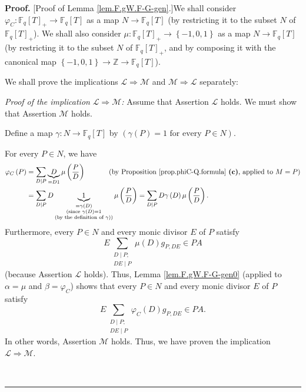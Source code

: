 \documentclass[numbers=enddot,12pt,final,onecolumn,notitlepage]{scrartcl}%
\theoremstyle{definition}
\newenvironment{proof}[1][Proof]{\noindent\textbf{#1.} }{\ \rule{0.5em}{0.5em}}
\let\sumnonlimits\sum
\renewcommand{\sum}{\sumnonlimits\limits}
\begin{document}
\begin{proof}
[Proof of Lemma \ref{lem.F.gW.F-G-gen}.]We shall consider $\varphi
_{C}:\mathbb{F}_{q}\left[  T\right]  _{+}\rightarrow\mathbb{F}_{q}\left[
T\right]  $ as a map $N\rightarrow\mathbb{F}_{q}\left[  T\right]  $ (by
restricting it to the subset $N$ of $\mathbb{F}_{q}\left[  T\right]  _{+}$).
We shall also consider $\mu:\mathbb{F}_{q}\left[  T\right]  _{+}%
\rightarrow\left\{  -1,0,1\right\}  $ as a map $N\rightarrow\mathbb{F}%
_{q}\left[  T\right]  $ (by restricting it to the subset $N$ of $\mathbb{F}%
_{q}\left[  T\right]  _{+}$, and by composing it with the canonical map
$\left\{  -1,0,1\right\}  \rightarrow\mathbb{Z}\rightarrow\mathbb{F}%
_{q}\left[  T\right]  $).

We shall prove the implications $\mathcal{L}\Longrightarrow\mathcal{M}$ and
$\mathcal{M}\Longrightarrow\mathcal{L}$ separately:

\textit{Proof of the implication }$\mathcal{L}\Longrightarrow\mathcal{M}%
$\textit{:} Assume that Assertion $\mathcal{L}$ holds. We must show that
Assertion $\mathcal{M}$ holds.

Define a map $\gamma:N\rightarrow\mathbb{F}_{q}\left[  T\right]  $ by $\left(
\gamma\left(  P\right)  =1\text{ for every }P\in N\right)  $.

For every $P\in N$, we have%
\begin{align*}
\varphi_{C}\left(  P\right)   &  =\sum_{D\mid P}\underbrace{D}_{=D1}\mu\left(
\dfrac{P}{D}\right)  \ \ \ \ \ \ \ \ \ \ \left(  \text{by Proposition
\ref{prop.phiC-Q.formula} \textbf{(c)}, applied to }M=P\right) \\
&  =\sum_{D\mid P}D\underbrace{1}_{\substack{=\gamma\left(  D\right)
\\\text{(since }\gamma\left(  D\right)  =1\\\text{(by the definition of
}\gamma\text{))}}}\mu\left(  \dfrac{P}{D}\right)  =\sum_{D\mid P}%
D\gamma\left(  D\right)  \mu\left(  \dfrac{P}{D}\right)  .
\end{align*}
Furthermore, every $P\in N$ and every monic divisor $E$ of $P$ satisfy%
\[
E\sum_{\substack{D\mid P;\\DE\mid P}}\mu\left(  D\right)  g_{P,DE}\in PA
\]
(because Assertion $\mathcal{L}$ holds). Thus, Lemma \ref{lem.F.gW.F-G-gen0}
(applied to $\alpha=\mu$ and $\beta=\varphi_{C}$) shows that every $P\in N$
and every monic divisor $E$ of $P$ satisfy%
\[
E\sum_{\substack{D\mid P;\\DE\mid P}}\varphi_{C}\left(  D\right)  g_{P,DE}\in
PA.
\]
In other words, Assertion $\mathcal{M}$ holds. Thus, we have proven the
implication $\mathcal{L}\Longrightarrow\mathcal{M}$.


\end{proof}
\end{document}
